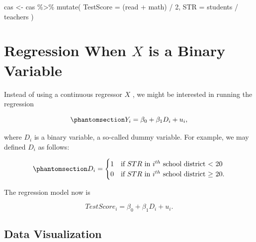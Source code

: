 \documentclass[
  12pt,
  letterpaper,
]{scrbook}
\newenvironment{Shaded}{\begin{snugshade}}{\end{snugshade}}
\newcommand{\AttributeTok}[1]{\textcolor[rgb]{0.40,0.45,0.13}{#1}}
\newcommand{\CommentTok}[1]{\textcolor[rgb]{0.37,0.37,0.37}{#1}}
\newcommand{\DecValTok}[1]{\textcolor[rgb]{0.68,0.00,0.00}{#1}}
\newcommand{\FunctionTok}[1]{\textcolor[rgb]{0.28,0.35,0.67}{#1}}
\newcommand{\NormalTok}[1]{\textcolor[rgb]{0.00,0.23,0.31}{#1}}
\newcommand{\OtherTok}[1]{\textcolor[rgb]{0.00,0.23,0.31}{#1}}
\newcommand{\SpecialCharTok}[1]{\textcolor[rgb]{0.37,0.37,0.37}{#1}}
\theoremstyle{definition}
\theoremstyle{plain}
\theoremstyle{remark}
\begin{document}
\begin{Shaded}
\begin{Highlighting}[]
\NormalTok{cas }\OtherTok{\textless{}{-}}\NormalTok{ cas }\SpecialCharTok{\%\textgreater{}\%}
    \FunctionTok{mutate}\NormalTok{(}
        \AttributeTok{TestScore =}\NormalTok{ (read }\SpecialCharTok{+}\NormalTok{ math) }\SpecialCharTok{/} \DecValTok{2}\NormalTok{,}
        \AttributeTok{STR =}\NormalTok{ students }\SpecialCharTok{/}\NormalTok{ teachers}
\NormalTok{    )}
\end{Highlighting}
\end{Shaded}

\section{\texorpdfstring{Regression When \(X\) is a Binary
Variable}{Regression When X is a Binary Variable}}\label{regression-when-x-is-a-binary-variable}

Instead of using a continuous regressor \(X\) , we might be interested
in running the regression

\begin{equation}\phantomsection\label{eq-binary-regression}{
Y_i = \beta_0 + \beta_1 D_i + u_i, 
}\end{equation}

where \(D_i\) is a binary variable, a so-called dummy variable. For
example, we may defined \(D_i\) as follows:

\begin{equation}\phantomsection\label{eq-dummy-variable}{
D_i = 
\begin{cases}
    1 & \text{if $STR$ in $i^{th}$ school district < 20} \\
    0 & \text{if $STR$ in $i^{th}$ school district $\geq$ 20}.
\end{cases}
}\end{equation}

The regression model now is

\[
TestScore_i = \beta_0 + \beta_1 D_i + u_i.
\]

\subsection{Data Visualization}\label{data-visualization-1}

\begin{Shaded}
\end{Shaded}
\end{document}
